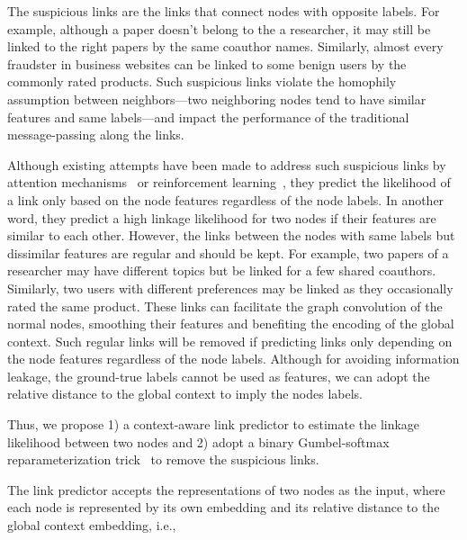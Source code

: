 { 
The suspicious links are the links that connect nodes with opposite labels. For example, although a paper doesn't belong to the a researcher, it may still be linked to the right papers by the same coauthor names. Similarly, almost every fraudster in business websites can be linked to some benign users by the commonly rated products. Such suspicious links violate the homophily assumption between neighbors---two neighboring nodes tend to have similar features and same labels---and impact the performance of the traditional message-passing along the links.

Although existing attempts have been made to address such suspicious links by attention mechanisms~\cite{wang2019semi, zhang2019key} or reinforcement learning~\cite{dou2020enhancing}, they predict the likelihood of a link only based on the node features regardless of the node labels. 
In another word, they predict a high linkage likelihood for two nodes if their features are similar to each other.
However, the links between the nodes with same labels but dissimilar features are regular and should be kept.
For example, two papers of a researcher may have different topics but be linked for a few shared coauthors. 
Similarly, two users with different preferences may be linked as they occasionally rated the same product. 
These links can facilitate the graph convolution of the normal nodes, smoothing their features and benefiting the encoding of the global context. 
Such regular links will be removed if predicting links only depending on the node features regardless of the node labels.
Although for avoiding information leakage, the ground-true labels cannot be used as features, we can adopt the relative distance to the global context to imply the nodes labels.

Thus, we propose 1) a context-aware link predictor to estimate the linkage likelihood between two nodes and 2) adopt a binary Gumbel-softmax reparameterization trick~\cite{maddison2016concrete, jang2016categorical} to remove the suspicious links.

The link predictor accepts the representations of two nodes as the input, where each node is represented by its own embedding and its relative distance to the global context embedding, i.e.,


}
